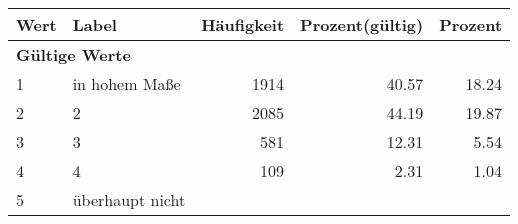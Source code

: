      \begin{longtable}{lXrrr}
     \toprule
     \textbf{Wert} & \textbf{Label} & \textbf{Häufigkeit} & \textbf{Prozent(gültig)} & \textbf{Prozent} \\
     \endhead
     \midrule
     \multicolumn{5}{l}{\textbf{Gültige Werte}}\\

     1 &
     \multicolumn{1}{X}{ in hohem Maße   } &


       \num{1914} &
       \num[round-mode=places,round-precision=2]{40,57} &
         \num[round-mode=places,round-precision=2]{18,24} \\

     2 &
     \multicolumn{1}{X}{ 2   } &


       \num{2085} &
       \num[round-mode=places,round-precision=2]{44,19} &
         \num[round-mode=places,round-precision=2]{19,87} \\

     3 &
     \multicolumn{1}{X}{ 3   } &


       \num{581} &
       \num[round-mode=places,round-precision=2]{12,31} &
         \num[round-mode=places,round-precision=2]{5,54} \\

     4 &
     \multicolumn{1}{X}{ 4   } &


       \num{109} &
       \num[round-mode=places,round-precision=2]{2,31} &
         \num[round-mode=places,round-precision=2]{1,04} \\

     5 &
     \multicolumn{1}{X}{ überhaupt nicht   } &



\end{longtable}
